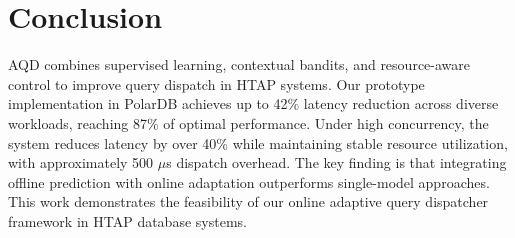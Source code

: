 \documentclass[sigconf, nonacm]{acmart}
\newcommand{\dispatcher}{AQD\xspace}
\begin{document}
\section{Conclusion}\label{sec:conclusion}
\dispatcher combines supervised learning, contextual bandits, and resource-aware control to improve query dispatch in HTAP systems. Our prototype implementation in PolarDB achieves up to 42\% latency reduction across diverse workloads, reaching 87\% of optimal performance. Under high concurrency, the system reduces latency by over 40\% while maintaining stable resource utilization, with approximately 500 $\mu$s dispatch overhead. The key finding is that integrating offline prediction with online adaptation outperforms single-model approaches. This work demonstrates the feasibility of our online adaptive query dispatcher framework in HTAP database systems.





\clearpage


\end{document}
